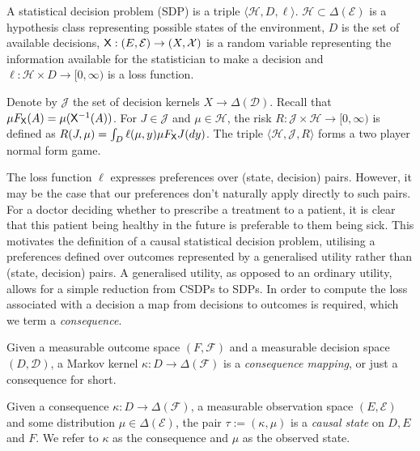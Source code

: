 \begin{definition}
A statistical decision problem (SDP) is a triple $\langle \mathscr{H}, D, \ell\rangle$. $\mathscr{H}\subset\Delta(\mathcal{E})$ is a hypothesis class representing possible states of the environment, $D$ is the set of available decisions, $\mathsf{X}:(E,\mathcal{E})\to (X,\mathcal{X})$ is a random variable representing the information available for the statistician to make a decision and $\ell:\mathcal{H}\times D\to [0,\infty)$ is a loss function.

Denote by $\mathscr{J}$ the set of decision kernels $X\to \Delta(\mathcal{D})$. Recall that $\mu F_{\mathsf{X}}(A)=\mu(\mathsf{X}^{-1}(A))$. For $J\in \mathscr{J}$ and $\mu\in \mathcal{H}$, the risk $R:\mathscr{J}\times\mathscr{H}\to [0,\infty)$ is defined as $R(J,\mu) = \int_D \ell(\mu,y) \mu F_{\mathsf{X}} J(dy)$. The triple $\langle \mathscr{H}, \mathscr{J}, R\rangle$ forms a two player normal form game.
\end{definition}


The loss function $\ell$ expresses preferences over (state, decision) pairs. However, it may be the case that our preferences don't naturally apply directly to such pairs. For a doctor deciding whether to prescribe a treatment to a patient, it is clear that this patient being healthy in the future is preferable to them being sick. This motivates the definition of a causal statistical decision problem, utilising a preferences defined over outcomes represented by a generalised utility rather than (state, decision) pairs. A generalised utility, as opposed to an ordinary utility, allows for a simple reduction from CSDPs to SDPs. In order to compute the loss associated with a decision a map from decisions to outcomes is required, which we term a \emph{consequence}.

\begin{definition}[Consequences]
Given a measurable outcome space $(F,\mathcal{F})$ and a measurable decision space $(D,\mathcal{D})$, a Markov kernel $\kappa:D \to \Delta(\mathcal{F})$ is a \emph{consequence mapping}, or just a consequence for short.
\end{definition}

\begin{definition}
Given a consequence $\kappa:D\to \Delta(\mathcal{F})$, a measurable observation space $(E,\mathcal{E})$ and some distribution $\mu\in \Delta(\mathcal{E})$, the pair $\tau:=(\kappa,\mu)$ is a \emph{causal state} on $D, E$ and $F$. We refer to $\kappa$ as the consequence and $\mu$ as the observed state.
\end{definition}

